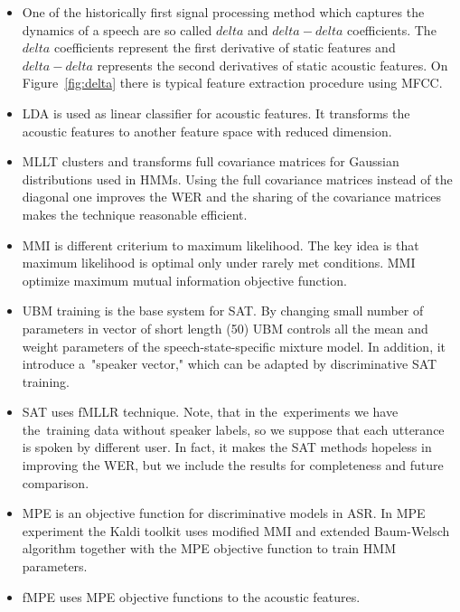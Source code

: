 \begin{itemize}
    \item {} 
        One of the historically first signal processing method which captures the dynamics of a speech
        are so called $delta$ and $delta-delta$ coefficients. The~$delta$ coefficients represent the first 
        derivative of static features and $delta-delta$ represents the second derivatives of static acoustic features.
        On Figure~\ref{fig:delta} there is typical feature extraction procedure using \ac{MFCC}\cite{ye2004speech}.
    \item \ac{LDA} is used as linear classifier for acoustic features. 
        It transforms the acoustic features to another feature space with reduced dimension.
    \item \ac{MLLT}\cite{psutka2007benefit} clusters and transforms full covariance matrices for Gaussian distributions used in \ac{HMM}s. Using the full covariance matrices instead of the diagonal one improves the \ac{WER} and the sharing of the covariance matrices makes the technique reasonable efficient.
    \item \ac{MMI} is different criterium to maximum likelihood. The key idea is that maximum likelihood is optimal only under rarely met conditions. \ac{MMI} optimize maximum mutual information objective function\cite{chow1990maximum}.
    \item \ac{UBM}\cite{povey2010subspace} training is the base system for \acl{SAT}. 
        By changing small number of parameters in vector of short length (50) \ac{UBM} controls all the mean and 
        weight parameters of the speech-state-specific mixture model. In addition, it introduce 
        a~"speaker vector," which can be adapted by discriminative \ac{SAT} training.
    \item \acl{SAT}\cite{povey2011kaldi} uses \ac{fMLLR} technique. Note, that in the~experiments we have 
        the~training data without speaker labels, so we suppose that each utterance is spoken by different user.
        In fact, it makes the \ac{SAT} methods hopeless in improving the \ac{WER}, 
        but we include the results for completeness and future comparison.
    \item {} \ac{MPE}\cite{povey2007evaluation} is an objective function for discriminative models in \ac{ASR}. In \ac{MPE} experiment the Kaldi toolkit uses modified \ac{MMI} and extended Baum-Welsch algorithm together with the \ac{MPE} objective function to train \ac{HMM} parameters.
    \item \cite{povey2005fmpe} \ac{fMPE} uses \ac{MPE} objective functions to the acoustic features. 
\end{itemize}

